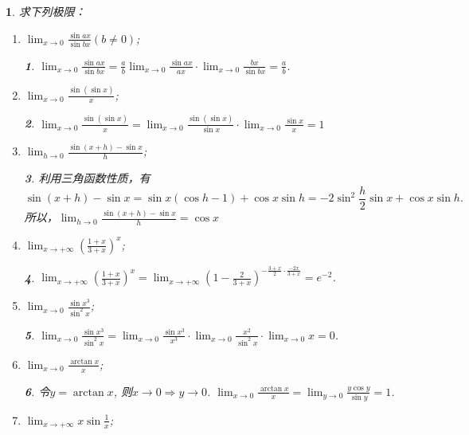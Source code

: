 \documentclass[utf8]{book}
\newtheorem{example}{}[section]             %
\newtheorem{solution}{}
\begin{document}
\begin{example}
求下列极限：
\renewcommand\labelenumi{\normalfont(\theenumi)}
\begin{enumerate}
\item $\displaystyle\lim_{x\to 0}\frac{\sin{ax}}{\sin{bx}}(b\neq 0)$;
\begin{solution}
$\displaystyle\lim_{x\to 0}\frac{\sin{ax}}{\sin{bx}}=\frac{a}{b}\displaystyle\lim_{x\to 0}\frac{\sin{ax}}{ax}\cdot\displaystyle\lim_{x\to 0}\frac{bx}{\sin{bx}}=\frac{a}{b}$.
\end{solution}
\item $\displaystyle\lim_{x\to 0}\frac{\sin(\sin{x})}{x}$;
\begin{solution}
$\displaystyle\lim_{x\to 0}\frac{\sin(\sin{x})}{x}=\displaystyle\lim_{x\to 0}\frac{\sin(\sin{x})}{\sin{x}}\cdot\displaystyle\lim_{x\to 0}\frac{\sin{x}}{x}=1$
\end{solution}
\item $\displaystyle\lim_{h\to 0}\frac{\sin(x+h)-\sin{x}}{h}$;
\begin{solution}利用三角函数性质，有
$$\sin(x+h)-\sin{x}=\sin{x}(\cos{h}-1)+\cos{x}\sin{h}=-2
\sin^2{\frac{h}{2}}\sin{x}+\cos{x}\sin{h}.$$
所以，$\displaystyle\lim_{h\to 0}\frac{\sin(x+h)-\sin{x}}{h}=\cos{x}$
\end{solution}
\item $\displaystyle\lim_{x\to +\infty}\left(\frac{1+x}{3+x}\right)^x$;
\begin{solution}
$\displaystyle\lim_{x\to +\infty}\left(\frac{1+x}{3+x}\right)^x=\displaystyle\lim_{x\to +\infty}\left(1-\frac{2}{3+x}\right)^{-\frac{3+x}{2}\cdot\frac{-2x}{3+x}}=e^{-2}$.
\end{solution}
\item $\displaystyle\lim_{x\to 0}\frac{\sin{x^3}}{\sin^2{x}}$;
\begin{solution}
$\displaystyle\lim_{x\to 0}\frac{\sin{x^3}}{\sin^2{x}}=\displaystyle\lim_{x\to 0}\frac{\sin{x^3}}{x^3}\cdot\displaystyle\lim_{x\to 0}\frac{x^2}{\sin^2{x}}\cdot\displaystyle\lim_{x\to 0}x=0$.
\end{solution}
\item $\displaystyle\lim_{x\to 0}\frac{\arctan{x}}{x}$;
\begin{solution}
令$y=\arctan{x}$, 则$x\to 0\Rightarrow y\to 0$.
$\displaystyle\lim_{x\to 0}\frac{\arctan{x}}{x}=\displaystyle\lim_{y\to 0}\frac{y\cos{y}}{\sin{y}}=1$.
\end{solution}
\item $\displaystyle\lim_{x\to +\infty}x\sin{\frac{1}{x}}$;

\end{enumerate}
\end{example}
\end{document}
